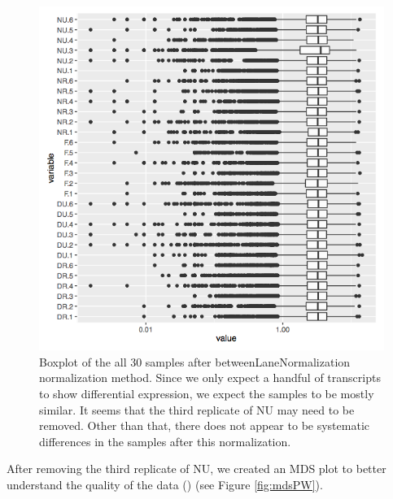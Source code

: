 \documentclass[11pt,a4paper,oldfontcommands,openany]{memoir}
\numberwithin{equation}{section} %
\begin{document}
\begin{figure}[H]
    \begin{framed}
    \centering
    \includegraphics[width=\textwidth]{boxplotPW}
    \end{framed}
    \caption{Boxplot of the all 30 samples after betweenLaneNormalization normalization method. Since we only expect a handful of transcripts to show differential expression, we expect the samples to be mostly similar. It seems that the third replicate of NU may need to be removed. Other than that, there does not appear to be systematic differences in the samples after this normalization.}
    \label{fig:boxplotPW}
\end{figure}

After removing the third replicate of NU, we created an MDS plot to better understand the quality of the data (\citealt{limma}) (see Figure \ref{fig:mdsPW}).
\end{document}
